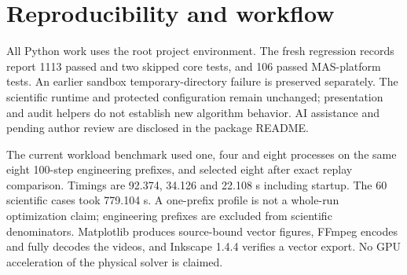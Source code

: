 \documentclass[10pt,letterpaper,conference,onecolumn]{ieeeconf}
\begin{document}
\section{Reproducibility and workflow}
All Python work uses the root project environment. The fresh regression records report 1113 passed and two skipped core tests, and 106 passed MAS-platform tests. An earlier sandbox temporary-directory failure is preserved separately. The scientific runtime and protected configuration remain unchanged; presentation and audit helpers do not establish new algorithm behavior. AI assistance and pending author review are disclosed in the package README.

The current workload benchmark used one, four and eight processes on the same eight 100-step engineering prefixes, and selected eight after exact replay comparison. Timings are 92.374, 34.126 and 22.108 s including startup. The 60 scientific cases took 779.104 s. A one-prefix profile is not a whole-run optimization claim; engineering prefixes are excluded from scientific denominators. Matplotlib produces source-bound vector figures, FFmpeg encodes and fully decodes the videos, and Inkscape 1.4.4 verifies a vector export. No GPU acceleration of the physical solver is claimed.
\end{document}
